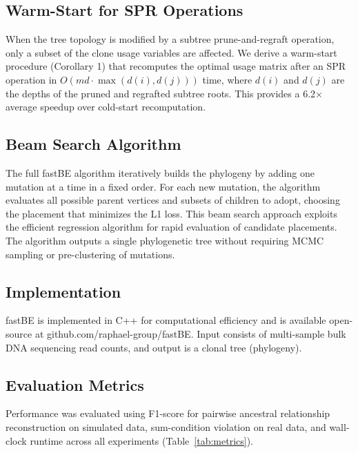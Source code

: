 \documentclass[11pt]{article}
\begin{document}
\subsection{Warm-Start for SPR Operations}

When the tree topology is modified by a subtree prune-and-regraft operation, only a subset of the clone usage variables are affected. We derive a warm-start procedure (Corollary 1) that recomputes the optimal usage matrix after an SPR operation in $O(md \cdot \max(d(i), d(j)))$ time, where $d(i)$ and $d(j)$ are the depths of the pruned and regrafted subtree roots. This provides a 6.2$\times$ average speedup over cold-start recomputation.

\subsection{Beam Search Algorithm}

The full fastBE algorithm iteratively builds the phylogeny by adding one mutation at a time in a fixed order. For each new mutation, the algorithm evaluates all possible parent vertices and subsets of children to adopt, choosing the placement that minimizes the L1 loss. This beam search approach exploits the efficient regression algorithm for rapid evaluation of candidate placements. The algorithm outputs a single phylogenetic tree without requiring MCMC sampling or pre-clustering of mutations.

\subsection{Implementation}

fastBE is implemented in C++ for computational efficiency and is available open-source at github.com/raphael-group/fastBE. Input consists of multi-sample bulk DNA sequencing read counts, and output is a clonal tree (phylogeny).

\subsection{Evaluation Metrics}

Performance was evaluated using F1-score for pairwise ancestral relationship reconstruction on simulated data, sum-condition violation on real data, and wall-clock runtime across all experiments (Table~\ref{tab:metrics}).
\end{document}
